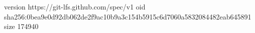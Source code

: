 version https://git-lfs.github.com/spec/v1
oid sha256:0bea9e0d92db062de2f9ac10b9a3c154b5915c6d7060a5832084482eab645891
size 174940
